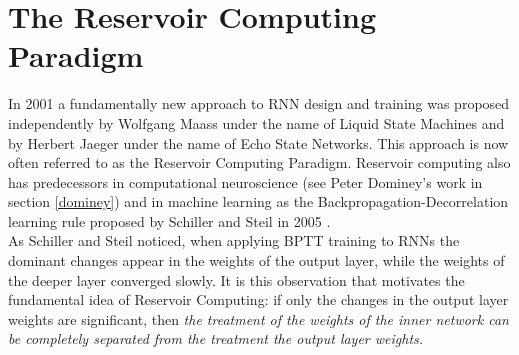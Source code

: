\documentclass[12pt,oneside]{CUNY_CS_PhD}
\begin{document}
\chapter{The Reservoir Computing Paradigm}
In 2001 a fundamentally new approach to RNN design and training was proposed independently by Wolfgang Maass under the name of Liquid State Machines and by Herbert Jaeger under the name of Echo State Networks. This approach is now often referred to as the Reservoir Computing Paradigm. Reservoir computing also has predecessors in computational neuroscience (see Peter Dominey's work in section \ref{dominey}) and in machine learning as the Backpropagation-Decorrelation learning rule proposed by Schiller and Steil in 2005 \cite{steil2004backpropagation}.\\
As Schiller and Steil noticed, when applying BPTT training to RNNs the dominant changes appear in the weights of the output layer, while the weights of the deeper layer converged slowly. It is this observation that  motivates the fundamental idea of Reservoir Computing: if only the changes in the output layer weights are significant, then {\itshape the treatment of the weights of the inner network can be completely separated from the treatment the output layer weights.}
\end{document}
